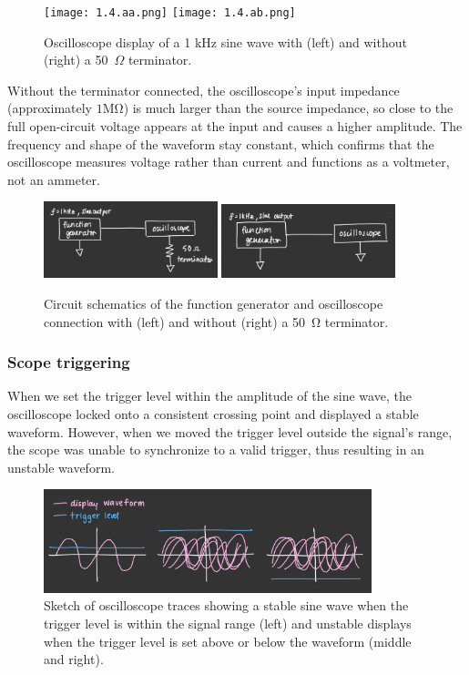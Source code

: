 \documentclass{article}
\begin{document}
\begin{figure}[H]
    \centering
    \texttt{[image: 1.4.aa.png]}
    \hfill
    \texttt{[image: 1.4.ab.png]}
    \caption{Oscilloscope display of a 1 kHz sine wave with (left) and without (right) a 50~$\Omega$ terminator.}
    \label{fig:scope_comparison}
\end{figure}

\noindent Without the terminator connected, the oscilloscope's input impedance
(approximately $1\si{\mega\ohm}$) is much larger than the source impedance, so
close to the full open-circuit voltage appears at the input and causes a higher
amplitude. The frequency and shape of the waveform stay constant, which confirms
that the oscilloscope measures voltage rather than current and functions as a
voltmeter, not an ammeter.

\begin{figure}[H]
    \centering
    \includegraphics[width=0.45\textwidth]{1.4.ac.png}
    \hfill
    \includegraphics[width=0.45\textwidth]{1.4.ad.png}
    \caption{Circuit schematics of the function generator and oscilloscope connection with (left) and without (right) a \SI{50}{\ohm} terminator.}
    \label{fig:circuit_comparison}
\end{figure}

\subsubsection{Scope triggering}

When we set the trigger level within the amplitude of the sine wave, the
oscilloscope locked onto a consistent crossing point and displayed a stable
waveform. However, when we moved the trigger level outside the signal's range,
the scope was unable to synchronize to a valid trigger, thus resulting in an
unstable waveform.

\begin{figure}[H]
    \centering
    \includegraphics[width=0.85\textwidth]{1.4.ba.png}
    \caption{Sketch of oscilloscope traces showing a stable sine wave when the trigger level is within the signal range (left) and unstable displays when the trigger level is set above or below the waveform (middle and right).}
    \label{fig:scope_trigger}
\end{figure}
\end{document}
